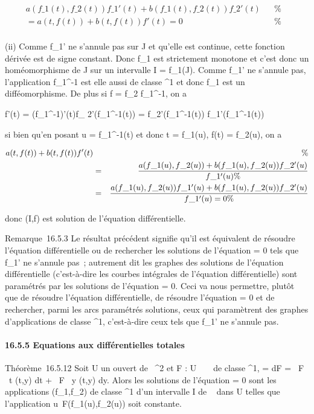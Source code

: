 \documentclass[]{article}
\begin{document}
\begin{align*}
a(f\_1(t),f\_2(t))f\_1'(t) +
b(f\_1(t),f\_2(t))f\_2'(t)& & \%&
\\ = a(t,f(t)) + b(t,f(t))f'(t) = 0& &
\%& \\ \end{align*}

(ii) Comme f\_1' ne s'annule pas sur J et qu'elle est continue,
cette fonction dérivée est de signe constant. Donc f\_1 est
strictement monotone et c'est donc un homéomorphisme de J sur un
intervalle I = f\_1(J). Comme f\_1' ne s'annule pas,
l'application f\_1^-1 est elle aussi de classe
^1 et donc f\_1 est un difféomorphisme. De plus si f
= f\_2 \cdot f\_1^-1, on a

f'(t) = \left
(f\_1^-1\right )'(t)f\_
2'(f\_1^-1(t)) =
f\_2'(f\_1^-1(t)) \over
f\_1'(f\_1^-1(t))

si bien qu'en posant u = f\_1^-1(t) et donc t =
f\_1(u), f(t) = f\_2(u), on a

\begin{align*} a(t,f(t)) + b(t,f(t))f'(t)&& \%&
\\ & =&
a(f\_1(u),f\_2(u)) +
b(f\_1(u),f\_2(u)) f\_2'(u)
\over f\_1'(u) \%&
\\ & =&
a(f\_1(u),f\_2(u))f\_1'(u) +
b(f\_1(u),f\_2(u))f\_2'(u) \over
f\_1'(u) = 0\%& \\
\end{align*}

donc (I,f) est solution de l'équation différentielle.

Remarque~16.5.3 Le résultat précédent signifie qu'il est équivalent de
résoudre l'équation différentielle ou de rechercher les solutions de
l'équation \omega = 0 tels que f\_1' ne s'annule pas~; autrement dit
les graphes des solutions de l'équation différentielle (c'est-à-dire les
courbes intégrales de l'équation différentielle) sont paramétrés par les
solutions de l'équation \omega = 0. Ceci va nous permettre, plutôt que de
résoudre l'équation différentielle, de résoudre l'équation \omega = 0 et de
rechercher, parmi les arcs paramétrés solutions, ceux qui paramètrent
des graphes d'applications de classe ^1, c'est-à-dire ceux
tels que f\_1' ne s'annule pas.

\paragraph{16.5.5 Equations aux différentielles totales}

Théorème~16.5.12 Soit U un ouvert de ~^2 et F : U \rightarrow~ ~ de
classe ^1, \omega = dF = \partial~F \over \partial~t (t,y) dt
+ \partial~F \over \partial~y (t,y) dy. Alors les solutions de
l'équation \omega = 0 sont les applications (f\_1,f\_2) de
classe ^1 d'un intervalle I de ~ dans U telles que
l'application
u\mapsto~F(f\_1(u),f\_2(u)) soit
constante.
\end{document}
